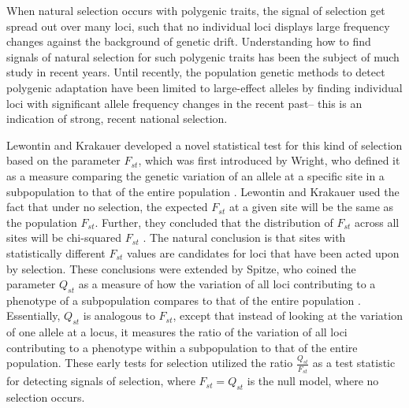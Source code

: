 \documentclass[a4paper,12pt]{article}
\begin{document}
When natural selection occurs with polygenic
traits, the signal of selection get spread out over many loci, such
that no individual loci displays large frequency changes against the
background of genetic drift. Understanding
how to find signals of natural selection for such polygenic traits has been
the subject of much study in recent years. Until recently, the
population genetic methods to detect polygenic adaptation have been
limited to large-effect alleles by finding individual loci with significant
allele frequency changes in the recent past-- this is an indication of
strong, recent national selection.

Lewontin and Krakauer developed a
novel statistical test for this kind of selection based on the
parameter $F_{st}$, which was first introduced by Wright, who
defined it as a measure comparing
the genetic variation of an allele at a specific site in a subpopulation to that of the entire population
\cite{Fst}. Lewontin and Krakauer used the fact
that under no selection, the expected $F_{st}$ at a given site will be the same
as the population $F_{st}$. Further, they concluded that the
distribution of $F_{st}$ across all sites will be chi-squared
$F_{st}$ \cite{firstseltest}. The natural conclusion is that sites
with statistically different $F_{st}$ values are candidates for loci
that have been acted upon by selection. These conclusions were extended by Spitze, who coined the
parameter $Q_{st}$ as a measure of how the variation of all loci
contributing to a phenotype of a subpopulation compares to that of the entire
population \cite{Qst}. Essentially, $Q_{st}$ is analogous to $F_{st}$,
except that instead of looking at the variation of one allele at a
locus, it measures the ratio of the variation of all loci contributing to a
phenotype within a subpopulation to that of the entire population. These early tests for selection utilized the ratio
$\frac{Q_{st}}{F_{st}}$ as a test statistic for detecting signals of
selection, where $F_{st} = Q_{st}$ is the null model, where no
selection occurs. 

\end{document}
